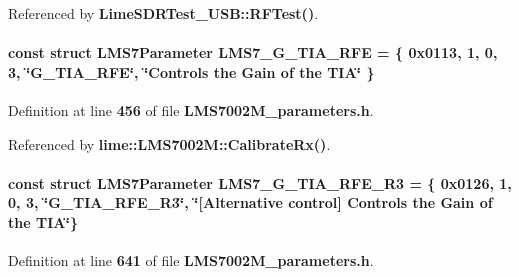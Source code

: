 Referenced by {\bf Lime\+S\+D\+R\+Test\+\_\+\+U\+S\+B\+::\+R\+F\+Test()}.

\paragraph[{L\+M\+S7\+\_\+\+G\+\_\+\+T\+I\+A\+\_\+\+R\+FE}]{\setlength{\rightskip}{0pt plus 5cm}const struct {\bf L\+M\+S7\+Parameter} L\+M\+S7\+\_\+\+G\+\_\+\+T\+I\+A\+\_\+\+R\+FE = \{ 0x0113, 1, 0, 3, \char`\"{}\+G\+\_\+\+T\+I\+A\+\_\+\+R\+F\+E\char`\"{}, \char`\"{}\+Controls the Gain of the T\+I\+A\char`\"{} \}\hspace{0.3cm}{\ttfamily [static]}}\label{LMS7002M__parameters_8h_ab8d35586a057075c77d47d3d27bec420}


Definition at line {\bf 456} of file {\bf L\+M\+S7002\+M\+\_\+parameters.\+h}.



Referenced by {\bf lime\+::\+L\+M\+S7002\+M\+::\+Calibrate\+Rx()}.

\paragraph[{L\+M\+S7\+\_\+\+G\+\_\+\+T\+I\+A\+\_\+\+R\+F\+E\+\_\+\+R3}]{\setlength{\rightskip}{0pt plus 5cm}const struct {\bf L\+M\+S7\+Parameter} L\+M\+S7\+\_\+\+G\+\_\+\+T\+I\+A\+\_\+\+R\+F\+E\+\_\+\+R3 = \{ 0x0126, 1, 0, 3, \char`\"{}\+G\+\_\+\+T\+I\+A\+\_\+\+R\+F\+E\+\_\+\+R3\char`\"{}, \char`\"{}[\+Alternative control] Controls the Gain of the T\+I\+A\char`\"{}\}\hspace{0.3cm}{\ttfamily [static]}}\label{LMS7002M__parameters_8h_a5af33bd19143bc7936f449c3f634bc22}


Definition at line {\bf 641} of file {\bf L\+M\+S7002\+M\+\_\+parameters.\+h}.

